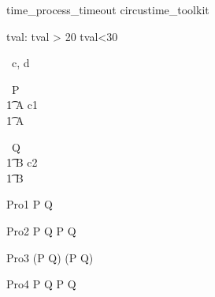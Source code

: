 \begin{zsection}
   \SECTION time\_process\_timeout \parents circustime\_toolkit
\end{zsection}


\begin{axdef}
   tval: \nat
\where
   tval > 20 \land tval<30
\end{axdef}



\begin{circus}
   \circchannel\ c, d \\
\end{circus}



\begin{circus}
    \circprocess\ P \circdef  \circbegin  \\
    \t1 A \circdef c1 \then \Skip \\
    \t1 \circspot A \\
    \circend
\end{circus}



\begin{circus}
    \circprocess\ Q \circdef  \circbegin  \\
    \t1 B \circdef c2 \then \Skip \\
    \t1 \circspot B \\
    \circend
\end{circus}


\begin{circus}
    \circprocess Pro1 \circdef P \circtimeout  {} \rcirctime Q\\
\end{circus}

\begin{circus}
    \circprocess Pro2 \circdef P \circtimeout {} \rcirctime Q \circseq P \circtimeout {} \rcirctime Q \\
\end{circus}
    
\begin{circus}
    \circprocess Pro3 \circdef (P \circtimeout {} \rcirctime Q) \circseq (P \circtimeout {} \rcirctime Q) \\
\end{circus}
    
\begin{circus}
    \circprocess Pro4 \circdef P \circtimeout {} \rcirctime Q \extchoice P \circtimeout {} \rcirctime Q \\ 
\end{circus}
    
